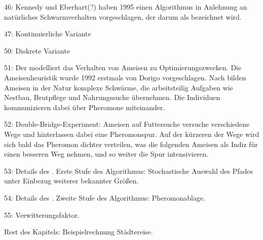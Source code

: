 
46: Kennedy und Eberhart(?) haben 1995 einen Algorithmus in Anlehnung an natürliches
Schwarmverhalten vorgeschlagen, der darum als \PSO bezeichnet wird.

47: Kontinuierliche Variante

50: Diskrete Variante


51: Der \AAL modelliert das Verhalten von Ameisen zu Optimierungszwecken. Die
Ameisenheuristik wurde 1992 erstmals von Dorigo vorgeschlagen. Nach
\citeauthor{bib:Kramer_2009_intelligence} bilden Ameisen in der Natur komplexe
Schwärme, die arbeitsteilig Aufgaben wie Nestbau, Brutpflege und Nahrungssuche
übernehmen. Die Individuen kommunizieren dabei über Pheromone miteinander.

52: Double-Bridge-Experiment: Ameisen auf Futtersuche versuche verschiedene Wege
und hinterlassen dabei eine Pheromonspur. Auf der kürzeren der Wege wird sich
bald das Pheromon dichter verteilen, was die folgenden Ameisen als Indiz für
einen besseren Weg nehmen, und so weiter die Spur intensivieren.

53: Details des \AAL.
Erste Stufe des Algorithmus: Stochastische Auswahl des Pfades unter Einbezug
weiterer bekannter Größen.

54: Details des \AAL.
Zweite Stufe des Algorithmus: Pheromonablage.

55: Verwitterungsfaktor.

Rest des Kapitels: Beispielrechnung Städtereise.
